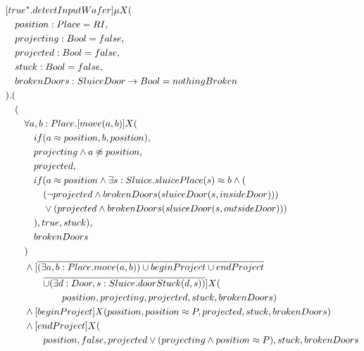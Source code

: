 \begin{description}
	\begin{align*}
& [true^*.detectInputWafer] \mu X( \\
&          \tab                          position: Place = RI,    \\  
&          \tab                          projecting: Bool = false,  \\
&          \tab                          projected: Bool = false,   \\
&          \tab                          stuck: Bool = false,       \\
&          \tab                          brokenDoors: SluiceDoor \to Bool = nothingBroken   \\
&                                 ).( \\
&  \tab ( \\
&  \tab\tab  \forall a,b:Place.[move(a,b)]X( \\
&  \tab\tab  \tab                              if(a \approx position, b, position), \\
&  \tab\tab  \tab                              projecting \wedge a \not \approx position, \\
&  \tab\tab  \tab                              projected, \\
&  \tab\tab  \tab                              if(a \approx position \wedge \exists s:Sluice . sluicePlace(s) \approx b \wedge ( \\
& \tab\tab\tab\tab (\neg projected \wedge brokenDoors(sluiceDoor(s, insideDoor))) \\ 
& \tab\tab\tab\tab \vee (projected \wedge brokenDoors(sluiceDoor(s, outsideDoor))) \\
& \tab\tab\tab ), true, stuck), \\
&  \tab\tab  \tab                              brokenDoors \\
&  \tab\tab                               ) \\
&  \tab\tab  \wedge [\overline{(\exists a,b:Place.move(a,b)) \cup beginProject \cup endProject} \\
& \tab\tab\tab\tab \overline{ \cup (\exists d:Door,s:Sluice.doorStuck(d, s))}]X( \\
& \tab\tab\tab\tab\tab\tab position, projecting, projected, stuck, brokenDoors) \\
&  \tab\tab  \wedge [beginProject]X(position, position \approx P, projected, stuck, brokenDoors) \\
&  \tab\tab  \wedge [endProject]X(\\
& \tab\tab\tab\tab position, false, projected \vee (projecting \wedge position \approx P),  stuck, brokenDoors \\

\end{align*}
\end{description}
